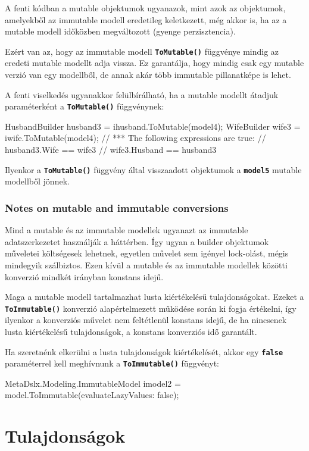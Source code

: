 \documentclass[12pt, a4paper]{report}
\newcommand{\ff}[1]{\textbf{\texttt{#1}}}
\begin{document}
A fenti kódban a mutable objektumok ugyanazok, mint azok az objektumok, amelyekből az immutable modell eredetileg keletkezett, még akkor is, ha az a mutable modell időközben megváltozott (gyenge perzisztencia).

Ezért van az, hogy az immutable modell \ff{ToMutable()} függvénye mindig az eredeti mutable modellt adja vissza. Ez garantálja, hogy mindig csak egy mutable verzió van egy modellből, de annak akár több immutable pillanatképe is lehet.

A fenti viselkedés ugyanakkor felülbírálható, ha a mutable modellt átadjuk paraméterként a \ff{ToMutable()} függvénynek:

\begin{csharpcode}
HusbandBuilder husband3 = ihusband.ToMutable(model4);
WifeBuilder wife3 = iwife.ToMutable(model4);
// *** The following expressions are true:
// husband3.Wife == wife3
// wife3.Husband == husband3
\end{csharpcode}

Ilyenkor a \ff{ToMutable()} függvény által visszaadott objektumok a \ff{model5} mutable modellből jönnek.

\subsubsection{Notes on mutable and immutable conversions}

Mind a mutable és az immutable modellek ugyanazt az immutable adatszerkezetet használják a háttérben. Így ugyan a builder objektumok műveletei költségesek lehetnek, egyetlen művelet sem igényel lock-olást, mégis mindegyik szálbiztos. Ezen kívül a mutable és az immutable modellek közötti konverzió mindkét irányban konstans idejű.

Maga a mutable modell tartalmazhat lusta kiértékelésű tulajdonságokat. Ezeket a \ff{ToImmutable()} konverzió alapértelmezett működése során ki fogja értékelni, így ilyenkor a konverziós művelet nem feltétlenül konstans idejű, de ha nincsenek lusta kiértékelésű tulajdonságok, a konstans konverziós idő garantált.

Ha szeretnénk elkerülni a lusta tulajdonságok kiértékelését, akkor egy \ff{false} paraméterrel kell meghívnunk a \ff{ToImmutable()} függvényt:
\begin{csharpcode}
MetaDslx.Modeling.ImmutableModel imodel2 = model.ToImmutable(evaluateLazyValues: false);
\end{csharpcode}

\section{Tulajdonságok}
\end{document}

